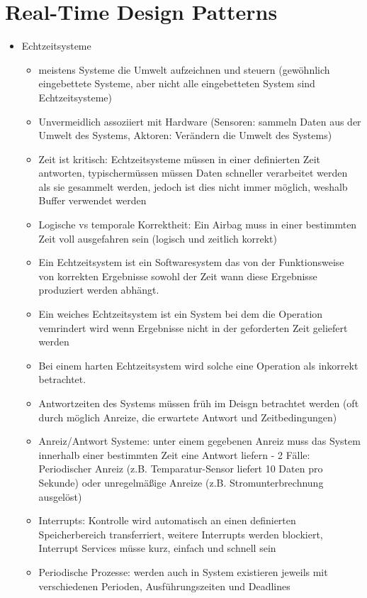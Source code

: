 \documentclass[paper=a4, fontsize=11pt]{scrartcl} %
\numberwithin{equation}{section} %
\numberwithin{figure}{section} %
\numberwithin{table}{section} %
\begin{document}
\section{Real-Time Design Patterns}

\begin{itemize}
  \item Echtzeitsysteme
  \begin{itemize}
    \item meistens Systeme die Umwelt aufzeichnen und steuern (gewöhnlich eingebettete Systeme, aber nicht alle eingebetteten System sind Echtzeitsysteme)
    \item Unvermeidlich assoziiert mit Hardware (Sensoren: sammeln Daten aus der Umwelt des Systems, Aktoren: Verändern die Umwelt des Systems)
    \item Zeit ist kritisch: Echtzeitsysteme müssen in einer definierten Zeit antworten, typischermüssen müssen Daten schneller verarbeitet werden als sie gesammelt werden, jedoch ist dies nicht immer möglich, weshalb Buffer verwendet werden
    \item Logische vs temporale Korrektheit: Ein Airbag muss in einer bestimmten Zeit voll ausgefahren sein (logisch und zeitlich korrekt)
    \item Ein Echtzeitsystem ist ein Softwaresystem das von der Funktionsweise von korrekten Ergebnisse sowohl der Zeit wann diese Ergebnisse produziert werden abhängt.
    \item Ein weiches Echtzeitsystem ist ein System bei dem die Operation vemrindert wird wenn Ergebnisse nicht in der geforderten Zeit geliefert werden
    \item Bei einem harten Echtzeitsystem wird solche eine Operation als inkorrekt betrachtet.
    \item Antwortzeiten des Systems müssen früh im Deisgn betrachtet werden (oft durch möglich Anreize, die erwartete Antwort und Zeitbedingungen)
    \item Anreiz/Antwort Systeme: unter einem gegebenen Anreiz muss das System innerhalb einer bestimmten Zeit eine Antwort liefern - 2 Fälle: Periodischer Anreiz (z.B. Temparatur-Sensor liefert 10 Daten pro Sekunde) oder unregelmäßige Anreize (z.B. Stromunterbrechnung ausgelöst)
    \item Interrupts: Kontrolle wird automatisch an einen definierten Speicherbereich transferriert, weitere Interrupts werden blockiert, Interrupt Services müsse kurz, einfach und schnell sein
    \item Periodische Prozesse: werden auch in System existieren jeweils mit verschiedenen Perioden, Ausführungszeiten und Deadlines

\end{itemize}
\end{itemize}
\end{document}
